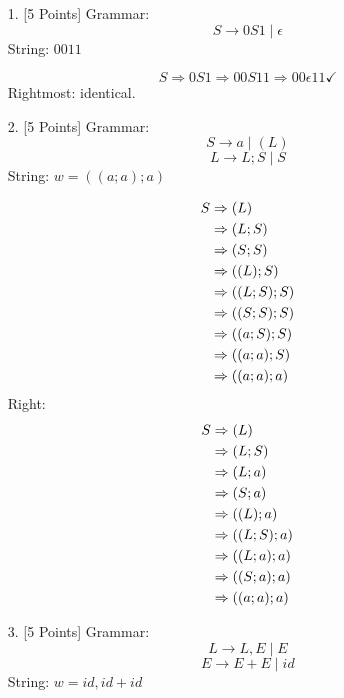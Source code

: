 \documentclass[12pt]{article}
\begin{document}
\begin{enumerate}[label=\arabic*.]
    \item[1.] [5 Points] Grammar: 
    \[
        S \rightarrow 0S1 \mid \epsilon
    \]
    String: $0011$
    
\begin{equation}
  S \Rightarrow 0S1 \Rightarrow 00S11 \Rightarrow 00\epsilon11 \checkmark
\end{equation}
Rightmost: identical.
    
    \item[2.] [5 Points] Grammar:
    \[
        S \rightarrow a \mid (L)
    \]
    \[
        L \rightarrow L;S \mid S
    \]
    String: $w = ((a; a); a)$
    
\begin{align}
S &\Rightarrow (L) \notag\\
  &\Rightarrow (L;S) \notag\\
  &\Rightarrow (S;S) \notag\\
  &\Rightarrow ((L);S) \notag\\
  &\Rightarrow ((L;S);S) \notag\\
  &\Rightarrow ((S;S);S) \notag\\
  &\Rightarrow ((a;S);S) \notag\\
  &\Rightarrow ((a;a);S) \notag\\
  &\Rightarrow ((a;a);a)
\end{align}
Right: 
\begin{align}
S &\Rightarrow (L) \notag\\
  &\Rightarrow (L;S) \notag\\
  &\Rightarrow (L;a) \notag\\
  &\Rightarrow (S;a) \notag\\
  &\Rightarrow ((L);a) \notag\\
  &\Rightarrow ((L;S);a) \notag\\
  &\Rightarrow ((L;a);a) \notag\\
  &\Rightarrow ((S;a);a) \notag\\
  &\Rightarrow ((a;a);a)
\end{align}



    
    \item[3.] [5 Points] Grammar:
    \[
        L \rightarrow L,E \mid E
    \]
    \[
        E \rightarrow E+E \mid id
    \]
    String: $w = id, id + id$
    

\end{enumerate}
\end{document}
